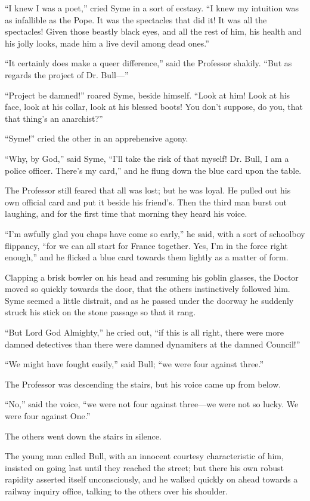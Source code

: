 \documentclass{book}
\begin{document}
“I knew I was a poet,” cried Syme in a sort of ecstasy. “I knew my intuition was as infallible as the Pope. It was the spectacles that did it! It was all the spectacles! Given those beastly black eyes, and all the rest of him, his health and his jolly looks, made him a live devil among dead ones.”

“It certainly does make a queer difference,” said the Professor shakily. “But as regards the project of Dr. Bull—”

“Project be damned!” roared Syme, beside himself. “Look at him! Look at his face, look at his collar, look at his blessed boots! You don’t suppose, do you, that that thing’s an anarchist?”

“Syme!” cried the other in an apprehensive agony.

“Why, by God,” said Syme, “I’ll take the risk of that myself! Dr. Bull, I am a police officer. There’s my card,” and he flung down the blue card upon the table.

The Professor still feared that all was lost; but he was loyal. He pulled out his own official card and put it beside his friend’s. Then the third man burst out laughing, and for the first time that morning they heard his voice.

“I’m awfully glad you chaps have come so early,” he said, with a sort of schoolboy flippancy, “for we can all start for France together. Yes, I’m in the force right enough,” and he flicked a blue card towards them lightly as a matter of form.

Clapping a brisk bowler on his head and resuming his goblin glasses, the Doctor moved so quickly towards the door, that the others instinctively followed him. Syme seemed a little distrait, and as he passed under the doorway he suddenly struck his stick on the stone passage so that it rang.

“But Lord God Almighty,” he cried out, “if this is all right, there were more damned detectives than there were damned dynamiters at the damned Council!”

“We might have fought easily,” said Bull; “we were four against three.”

The Professor was descending the stairs, but his voice came up from below.

“No,” said the voice, “we were not four against three—we were not so lucky. We were four against One.”

The others went down the stairs in silence.

The young man called Bull, with an innocent courtesy characteristic of him, insisted on going last until they reached the street; but there his own robust rapidity asserted itself unconsciously, and he walked quickly on ahead towards a railway inquiry office, talking to the others over his shoulder.
\end{document}
